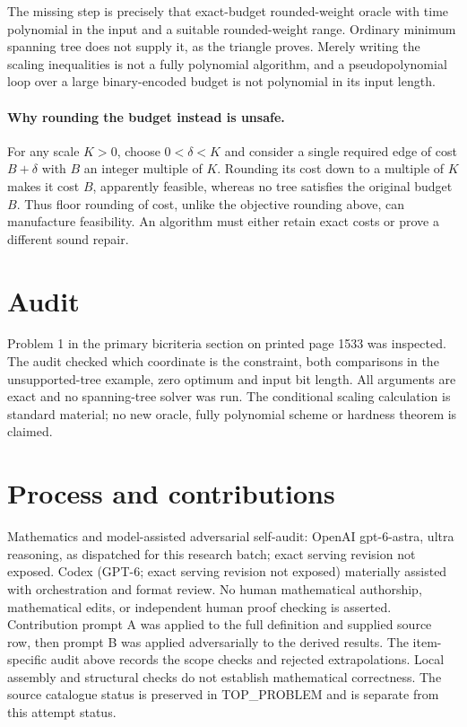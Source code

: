 \documentclass[11pt]{article}
\begin{document}
The missing step is precisely that exact-budget rounded-weight oracle
with time polynomial in the input and a suitable rounded-weight
range. Ordinary minimum spanning tree does not supply it, as the
triangle proves. Merely writing the scaling inequalities is not a
fully polynomial algorithm, and a pseudopolynomial loop over a large
binary-encoded budget is not polynomial in its input length.

\paragraph{Why rounding the budget instead is unsafe.}
For any scale $K>0$, choose $0<\delta<K$ and consider a
single required edge of cost $B+\delta$ with $B$ an integer
multiple of $K$. Rounding its cost down to a multiple of $K$
makes it cost $B$, apparently feasible, whereas no tree satisfies
the original budget $B$. Thus floor rounding of cost, unlike the
objective rounding above, can manufacture feasibility. An algorithm
must either retain exact costs or prove a different sound repair.

\section{Audit}
Problem 1 in the primary bicriteria section on printed page 1533
was inspected. The audit checked which coordinate is the constraint,
both comparisons in the unsupported-tree example, zero optimum and
input bit length. All arguments are exact and no spanning-tree solver
was run. The conditional scaling calculation is standard material;
no new oracle, fully polynomial scheme or hardness theorem is claimed.

\section{Process and contributions}
Mathematics and model-assisted adversarial self-audit: OpenAI gpt-6-astra, ultra reasoning, as dispatched for this research batch; exact serving revision not exposed. Codex (GPT-6; exact serving revision not exposed) materially assisted with orchestration and format review. No human mathematical authorship, mathematical edits, or independent human proof checking is asserted.
Contribution prompt A was applied to the full definition and supplied source row, then prompt B was applied adversarially to the derived results. The item-specific audit above records the scope checks and rejected extrapolations. Local assembly and structural checks do not establish mathematical correctness. The source catalogue status is preserved in TOP\_PROBLEM and is separate from this attempt status.
\end{document}
